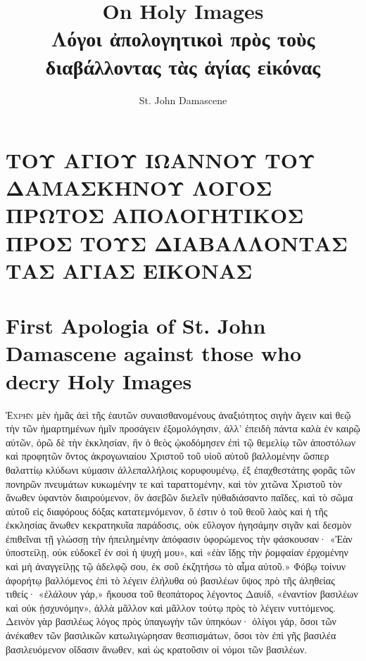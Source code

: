 \documentclass[10pt]{book}
\title{On Holy Images\\Λόγοι ἀπολογητικοὶ πρὸς τοὺς διαβάλλοντας τὰς ἁγίας εἰκόνας}
\author{St. John Damascene}
\newcommand{\switchgreek}[1][]{\selectlanguage{polutonikogreek} \switchcolumn*[#1]}
\newcommand{\switchenglish}{\selectlanguage{english} \switchcolumn}
\begin{document}
\maketitle


\begin{paracol}{2}


\section*{ΤΟΥ ΑΓΙΟΥ ΙΩΑΝΝΟΥ ΤΟΥ ΔΑΜΑΣΚΗΝΟΥ ΛΟΓΟΣ ΠΡΩΤΟΣ ΑΠΟΛΟΓΗΤΙΚΟΣ ΠΡΟΣ ΤΟΥΣ ΔΙΑΒΑΛΛΟΝΤΑΣ ΤΑΣ ΑΓΙΑΣ ΕΙΚΟΝΑΣ}

\switchenglish

\section*{First Apologia of St. John Damascene against those who decry Holy Images}

\switchgreek

\lettrine{Ἐ}{χρῆν} μὲν ἡμᾶς ἀεὶ τῆς ἑαυτῶν συναισθανομένους
ἀναξιότητος σιγὴν ἄγειν καὶ θεῷ τὴν τῶν ἡμαρτημένων ἡμῖν προσάγειν
ἐξομολόγησιν, ἀλλ’ ἐπειδὴ πάντα καλὰ ἐν καιρῷ αὐτῶν, ὁρῶ δὲ τὴν ἐκκλησίαν,
ἣν ὁ θεὸς ᾠκοδόμησεν ἐπὶ τῷ θεμελίῳ τῶν ἀποστόλων καὶ προφητῶν ὄντος
ἀκρογωνιαίου Χριστοῦ τοῦ υἱοῦ αὐτοῦ βαλλομένην ὥσπερ θαλαττίῳ κλύδωνι
κύμασιν ἀλλεπαλλήλοις κορυφουμένῳ, ἐξ ἐπαχθεστάτης φορᾶς τῶν πονηρῶν
πνευμάτων κυκωμένην τε καὶ ταραττομένην, καὶ τὸν χιτῶνα Χριστοῦ τὸν ἄνωθεν
ὑφαντὸν διαιρούμενον, ὃν ἀσεβῶν διελεῖν ηὐθαδιάσαντο παῖδες, καὶ τὸ σῶμα
αὐτοῦ εἰς διαφόρους δόξας κατατεμνόμενον, ὅ ἐστιν ὁ τοῦ θεοῦ λαὸς καὶ ἡ
τῆς ἐκκλησίας ἄνωθεν κεκρατηκυῖα παράδοσις, οὐκ εὔλογον ἡγησάμην σιγᾶν καὶ
δεσμὸν ἐπιθεῖναι τῇ γλώσσῃ τὴν ἠπειλημένην ἀπόφασιν ὑφορώμενος τὴν
φάσκουσαν· «Ἐὰν ὑποστείλῃ, οὐκ εὐδοκεῖ ἐν σοὶ ἡ ψυχή μου», καὶ «ἐὰν ἴδῃς
τὴν ῥομφαίαν ἐρχομένην καὶ μὴ ἀναγγείλῃς τῷ ἀδελφῷ σου, ἐκ σοῦ ἐκζητήσω τὸ
αἷμα αὐτοῦ.» Φόβῳ τοίνυν ἀφορήτῳ βαλλόμενος ἐπὶ τὸ λέγειν ἐλήλυθα οὐ
βασιλέων ὕψος πρὸ τῆς ἀληθείας τιθείς· «ἐλάλουν γάρ,» ἤκουσα τοῦ
θεοπάτορος λέγοντος Δαυίδ, «ἐναντίον βασιλέων καὶ οὐκ ᾐσχυνόμην», ἀλλὰ
μᾶλλον καὶ μᾶλλον τούτῳ πρὸς τὸ λέγειν νυττόμενος. Δεινὸν γὰρ βασιλέως
λόγος πρὸς ὑπαγωγὴν τῶν ὑπηκόων· ὀλίγοι γάρ, ὅσοι τῶν ἀνέκαθεν τῶν
βασιλικῶν κατωλιγώρησαν θεσπισμάτων, ὅσοι τὸν ἐπὶ γῆς βασιλέα
βασιλευόμενον οἴδασιν ἄνωθεν, καὶ ὡς κρατοῦσιν οἱ νόμοι τῶν βασιλέων.


\end{paracol}
\end{document}
